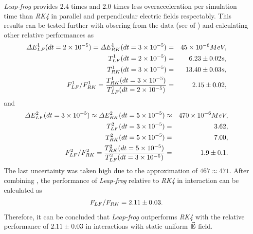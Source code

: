 \documentclass[a4paper,oneside,12pt]{report}
\numberwithin{equation}{chapter}
\begin{document}
\textit{Leap-frog} provides $2.4$ times and $2.0$ times less overacceleration per simulation time than 
\textit{RK4} in parallel and perpendicular electric fields respectably.
This results can be tested further with obsering from the data (see  of )
and calculating other relative performances as
\vspace{-10pt}\begin{eqnarray} \label{eq:f_lf_rk_3}
    \Delta E_{LF}^1 (dt=2 \times 10^{-5}) = \Delta E_{RK}^1 (dt=3 \times 10^{-5}) &=& 45 \times 10^{-6} MeV, \\
    T_{LF}^1(dt=2 \times 10^{-5})  &=& 6.23 \pm 0.02 s, \\ %
    T_{RK}^1(dt=3 \times 10^{-5})  &=& 13.40 \pm 0.03 s, \\ %
    F_{LF}^1/F_{RK}^1 = \frac{T_{RK}^1(dt=3 \times 10^{-5})}{T_{LF}^1(dt=2 \times 10^{-5})} &=& 2.15 \pm 0.02,
\vspace{-10pt}\end{eqnarray}
and
\vspace{-10pt}\begin{eqnarray} \label{eq:f_lf_rk_4}
    \Delta E_{LF}^2 (dt=3 \times 10^{-5}) \approx \Delta E_{RK}^2 (dt=5 \times 10^{-5}) &\approx& 470 \times 10^{-6} MeV, \\
    T_{LF}^2(dt=3 \times 10^{-5})  &=& 3.62, \\ %
    T_{RK}^2(dt=5 \times 10^{-5})  &=& 7.00, \\ %
    F_{LF}^2/F_{RK}^2 = \frac{T_{RK}^2(dt=5 \times 10^{-5})}{T_{LF}^2(dt=3 \times 10^{-5})} &=& 1.9 \pm 0.1.
\vspace{-10pt}\end{eqnarray}
The last uncertainty was taken high due to the approximation of $467 \approx 471$. After combining ,
the performance of \textit{Leap-frog} relative to \textit{RK4} in \eE interaction can be calculated as
\vspace{-10pt}\begin{equation}\label{eq:lf_rk_eE_relative_performance}
    F_{LF}/F_{RK} = 2.11 \pm 0.03.
\vspace{-10pt}\end{equation}
Therefore, it can be concluded that \textit{Leap-frog} outperforms \textit{RK4} with the relative performance of $2.11 \pm 0.03$ in \eE interactions with static uniform $\vec{\textbf{E}}$ field. 
\end{document}

